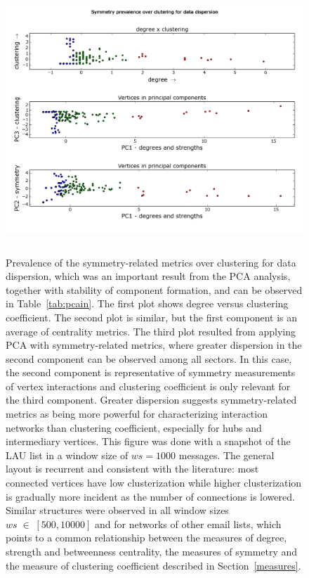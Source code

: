 \documentclass[%
 aip,
 jmp,%
 amsmath,amssymb,
 reprint,%
]{revtex4-1}
\begin{document}
\begin{figure} 
   \centering
        \includegraphics[width=.6\textwidth,height=10cm]{figs/im13PCAPLOT_}
	\caption{Prevalence of the symmetry-related metrics over clustering for data dispersion, which was an important result from the PCA analysis, together with stability of component formation, and can be observed in Table~\ref{tab:pcain}.
		The first plot shows degree versus clustering coefficient.
		The second plot is similar, but the first component is an average of centrality metrics.
		The third plot resulted from applying PCA with symmetry-related metrics, where greater dispersion in the second component can be observed among all sectors.
		In this case, the second component is representative of symmetry measurements of vertex interactions and clustering coefficient is only relevant for the third component.
		Greater dispersion suggests symmetry-related metrics as being more powerful for characterizing interaction networks than clustering coefficient, especially for hubs and intermediary vertices.
		This figure was done with a snapshot of the LAU list in a window size of $ws = 1000$ messages.
		The general layout is recurrent and consistent with the literature: most connected vertices have low clusterization while higher clusterization is gradually more incident as the number of connections is lowered.
		Similar structures were observed in all window sizes $ws\;\in\;[500,10000]$ and for networks of other email lists, which points to a common relationship between the measures of degree, strength and betweenness centrality, the measures of symmetry and the measure of clustering coefficient described in Section~\ref{measures}.
    }
    \label{fig:sym}
\end{figure}
\end{document}
